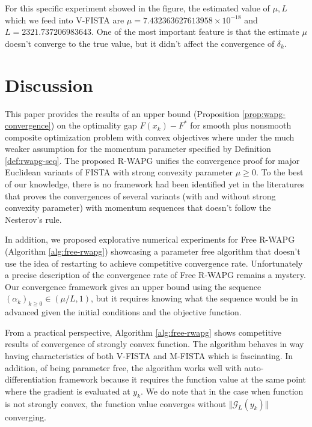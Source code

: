 \documentclass[12pt]{article}
\begin{document}
            For this specific experiment showed in the figure, the estimated value of $\mu, L$ which we feed into V-FISTA are $\mu = 7.432363627613958\times 10^{-18}$ and $L = 2321.737206983643$. 
            One of the most important feature is that the estimate $\mu$ doesn't converge to the true value, but it didn't affect the convergence of $\delta_k$. 

\section{Discussion}
    This paper provides the results of an upper bound (Proposition \ref{prop:wapg-convergence}) on the optimality gap $F(x_k) - F^*$ for smooth plus nonsmooth composite optimization problem with convex objectives where under the much weaker assumption for the momentum parameter specified by Definition \ref{def:rwapg-seq}. 
    The proposed R-WAPG unifies the convergence proof for major Euclidean variants of FISTA with strong convexity parameter $\mu \ge 0$. 
    To the best of our knowledge, there is no framework had been identified yet in the literatures that proves the convergences of several variants (with and without strong convexity parameter) with momentum sequences that doesn't follow the Nesterov's rule. 
    \par
    In addition, we proposed explorative numerical experiments for Free R-WAPG (Algorithm \ref{alg:free-rwapg}) showcasing a parameter free algorithm that doesn't use the idea of restarting to achieve competitive convergence rate. 
    Unfortunately a precise description of the convergence rate of Free R-WAPG remains a mystery. 
    Our convergence framework gives an upper bound using the sequence $(\alpha_k)_{k \ge 0} \in (\mu/L, 1)$, but it requires knowing what the sequence would be in advanced given the initial conditions and the objective function. 
    \par
    From a practical perspective, Algorithm \ref{alg:free-rwapg} shows competitive results of convergence of strongly convex function.  
    The algorithm behaves in way having characteristics of both V-FISTA and M-FISTA which is fascinating. 
    In addition, of being parameter free, the algorithm works well with auto-differentiation framework because it requires the function value at the same point where the gradient is evaluated at $y_k$. 
    We do note that in the case when function is not strongly convex, the function value converges without $\Vert \mathcal G_L(y_k)\Vert$ converging. 




            
            

            




\appendix
\end{document}
